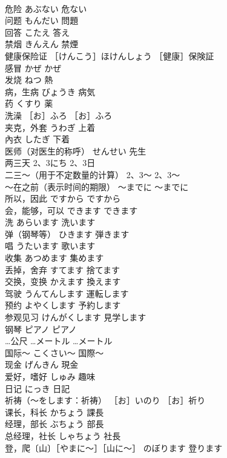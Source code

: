 \documentclass[8pt]{extreport}
\begin{document}
\begin{CJK}{UTF8}{min}
\\	危险	あぶない	危ない
\\	问题	もんだい	問題
\\	回答	こたえ	答え
\\	禁烟	きんえん	禁煙
\\	健康保险证	［けんこう］ほけんしょう	［健康］保険証
\\	感冒	かぜ	かぜ
\\	发烧	ねつ	熱
\\	病，生病	びょうき	病気
\\	药	くすり	薬
\\	洗澡	［お］ふろ	［お］ふろ
\\	夹克，外套	うわぎ	上着
\\	內衣	したぎ	下着
\\	医师（对医生的称呼）	せんせい	先生
\\	两三天	2、3にち	2、3日
\\	二三～（用于不定数量的计算）	2、3～	2、3～
\\	～在之前（表示时间的期限）	～までに	～までに
\\	所以，因此	ですから	ですから
\\	会，能够，可以	できます	できます
\\	洗	あらいます	洗います
\\	弹（钢琴等）	ひきます	弾きます
\\	唱	うたいます	歌います
\\	收集	あつめます	集めます
\\	丢掉，舍弃	すてます	捨てます
\\	交换，变换	かえます	換えます
\\	驾驶	うんてんします	運転します
\\	预约	よやくします	予約します
\\	参观见习	けんがくします	見学します
\\	钢琴	ピアノ	ピアノ
\\	…公尺	…メートル	…メートル
\\	国际～	こくさい～	国際～
\\	现金	げんきん	現金
\\	爱好，嗜好	しゅみ	趣味
\\	日记	にっき	日記
\\	祈祷（～をします：祈祷）	［お］いのり	［お］祈り
\\	课长，科长	かちょう	課長
\\	经理，部长	ぶちょう	部長
\\	总经理，社长	しゃちょう	社長
\\	登，爬〔山〕［やまに～］［山に～］	のぼります	登ります

\end{CJK}
\end{document}
